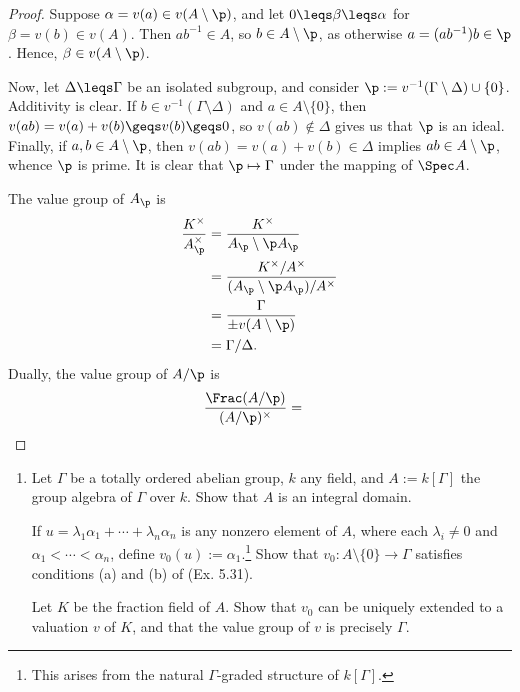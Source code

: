 \documentclass[12pt]{amsart}
\begin{document}
\begin{proof}
  Suppose $\alpha=v(a)\in v(A\setminus \p)$, and let $0\leqs \beta\leqs \alpha$ for $\beta=v(b)\in v(A)$.
  Then $ab^{-1}\in A$, so $b\in A\setminus \p$, as otherwise $a=(ab^{-1})b\in \p$.
  Hence, $\beta\in v(A\setminus \p)$.

  Now, let $\Delta\leqs \Gamma$ be an isolated subgroup, and consider $\p:=v^{-1} (\Gamma\setminus\Delta)\cup\{0\}$.
  Additivity is clear.
  If $b\in v^{-1}(\Gamma\setminus\Delta)$ and $a\in A\setminus\{0\}$, then $v(ab)=v(a)+v(b)\geqs v(b)\geqs 0$, so $v(ab)\notin \Delta$ gives us that $\p$ is an ideal.
  Finally, if $a,b\in A\setminus \p$, then $v(ab)=v(a)+v(b)\in \Delta$ implies $ab\in A\setminus \p$, whence $\p$ is prime.
  It is clear that $\p\mapsto \Gamma$ under the mapping of $\Spec A$.

  The value group of $A_\p$ is
  \begin{align*}
    \frac{K^\times}{A_\p^\times}
    &= \frac{K^\times}{A_\p\setminus \p A_\p} \\
    &= \frac{K^\times/A^\times}{(A_\p\setminus \p A_\p)/A^\times} \\
    &= \frac{\Gamma}{\pm v(A\setminus \p)} \\
    &= \Gamma/\Delta.
  \end{align*}
  Dually, the value group of $A/\p$ is
  \begin{align*}
    \frac{\Frac(A/\p)}{(A/\p)^\times}
    &= 
  \end{align*}
\end{proof}

\begin{enumerate}
  \item[5.33] {
      Let $\Gamma$ be a totally ordered abelian group, $k$ any field, and $A:=k[\Gamma]$ the group algebra of $\Gamma$ over $k$.
      Show that $A$ is an integral domain.

      If $u=\lambda_1\alpha_1+\cdots+\lambda_n\alpha_n$ is any nonzero element of $A$, where each $\lambda_i\neq0$ and $\alpha_1<\cdots<\alpha_n$, define $v_0(u):=\alpha_1$.\footnote{This arises from the natural $\Gamma$-graded structure of $k[\Gamma]$.}
      Show that $v_0:A\setminus\{0\}\to \Gamma$ satisfies conditions (a) and (b) of (Ex. 5.31).
      
      Let $K$ be the fraction field of $A$.
      Show that $v_0$ can be uniquely extended to a valuation $v$ of $K$, and that the value group of $v$ is precisely $\Gamma$.
    }
\end{enumerate}
\end{document}
